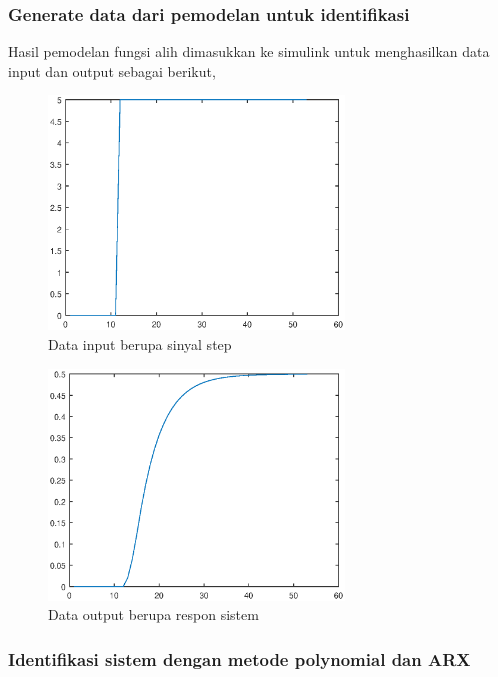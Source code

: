 \documentclass[../main.tex]{subfiles}
\begin{document}
            \subsubsection{Generate data dari pemodelan untuk identifikasi}
                Hasil pemodelan fungsi alih dimasukkan ke simulink untuk menghasilkan data input dan output sebagai berikut,
                \begin{figure}[H]
                    \centering
                    \includegraphics[width = 0.7\textwidth]{assets/image/INPUT.eps}
                    \caption{Data input berupa sinyal step}
                    \label{gambar_2}
                \end{figure}
                \begin{figure}[H]
                    \centering
                    \includegraphics[width = 0.7\textwidth]{assets/image/OUTPUT.eps}
                    \caption{Data output berupa respon sistem}
                    \label{gambar_3}
                \end{figure}
            \subsubsection{Identifikasi sistem dengan metode            polynomial dan ARX}
                
\end{document}
